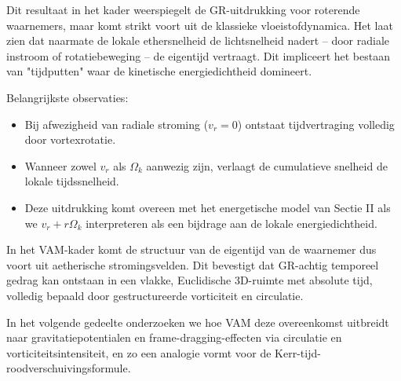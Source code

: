 Dit resultaat in het kader weerspiegelt de GR-uitdrukking voor roterende waarnemers, maar komt strikt voort uit de klassieke vloeistofdynamica. Het laat zien dat naarmate de lokale ethersnelheid de lichtsnelheid nadert – door radiale instroom of rotatiebeweging – de eigentijd vertraagt. Dit impliceert het bestaan ​​van "tijdputten" waar de kinetische energiedichtheid domineert.

Belangrijkste observaties:

\begin{itemize}
\item Bij afwezigheid van radiale stroming (\(v_r = 0\)) ontstaat tijdvertraging volledig door vortexrotatie.
\item Wanneer zowel \(v_r\) als \(\Omega_k\) aanwezig zijn, verlaagt de cumulatieve snelheid de lokale tijdssnelheid.
\item Deze uitdrukking komt overeen met het energetische model van Sectie II als we \(v_r + r\Omega_k\) interpreteren als een bijdrage aan de lokale energiedichtheid.
\end{itemize}

In het VAM-kader komt de structuur van de eigentijd van de waarnemer dus voort uit aetherische stromingsvelden. Dit bevestigt dat GR-achtig temporeel gedrag kan ontstaan ​​in een vlakke, Euclidische 3D-ruimte met absolute tijd, volledig bepaald door gestructureerde vorticiteit en circulatie.

In het volgende gedeelte onderzoeken we hoe VAM deze overeenkomst uitbreidt naar gravitatiepotentialen en frame-dragging-effecten via circulatie en vorticiteitsintensiteit, en zo een analogie vormt voor de Kerr-tijd-roodverschuivingsformule.
